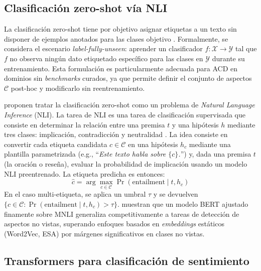 \subsection{Clasificación zero-shot vía NLI} \label{subsec:zero_shot}

La clasificación zero-shot tiene por objetivo asignar etiquetas a un texto sin disponer de ejemplos anotados para las clases objetivo \citep{yin_benchmarking_2019}. Formalmente, se considera el escenario \textit{label-fully-unseen}: aprender un clasificador $f : \mathcal{X} \to \mathcal{Y}$ tal que $f$ no observa ningún dato etiquetado específico para las clases en $\mathcal{Y}$ durante su entrenamiento. Esta formulación es particularmente adecuada para ACD en dominios sin \textit{benchmarks} curados, ya que permite definir el conjunto de aspectos $\mathcal{C}$ post-hoc y modificarlo sin reentrenamiento.

\citet{yin_benchmarking_2019} proponen tratar la clasificación zero-shot como un problema de \textit{Natural Language Inference} (NLI). La tarea de NLI es una tarea de clasificación supervisada que consiste en determinar la relación entre una premisa $t$ y una hipótesis $h$ mediante tres clases: implicación, contradicción y neutralidad \citep{maccartney2009natural}. La idea consiste en convertir cada etiqueta candidata $c \in \mathcal{C}$ en una hipótesis $h_c$ mediante una plantilla parametrizada (e.g., ``\textit{Este texto habla sobre $\{c\}$.}'') y, dada una premisa $t$ (la oración o reseña), evaluar la probabilidad de implicación usando un modelo NLI preentrenado. La etiqueta predicha es entonces:
\begin{equation} \label{eq:zeroshot_nli}
	\hat{c} = \arg\max_{c \in \mathcal{C}} \Pr\!\left(\text{entailment} \mid t, h_c\right)
\end{equation}
En el caso multi-etiqueta, se aplica un umbral $\tau$ y se devuelven $\{c \in \mathcal{C} : \Pr(\text{entailment} \mid t, h_c) > \tau\}$. \citet{yin_benchmarking_2019} muestran que un modelo BERT ajustado finamente sobre MNLI \citep{williams_broad-coverage_2018} generaliza competitivamente a tareas de detección de aspectos no vistas, superando enfoques basados en \textit{embeddings} estáticos (Word2Vec, ESA) por márgenes significativos en clases no vistas.

\subsection{Transformers para clasificación de sentimiento} \label{subsec:sentiment_models}

